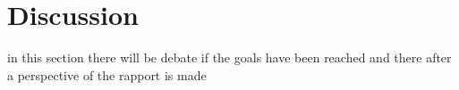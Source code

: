 \section{Discussion}
in this section there will be debate if the goals have been reached and there after a perspective of the rapport is made

